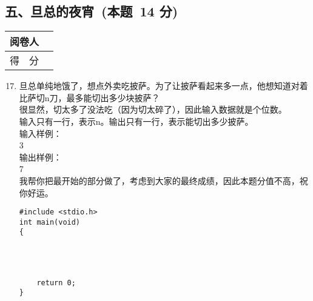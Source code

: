 \documentclass[twocolumn,landscape,UTF8]{ctexart}
\begin{document}
\begin{spacing}{1.3}
\section*{\hspace{4.5cm} 五、旦总的夜宵~(本题~14 分)}
\vspace{-1.5cm}
\begin{tabular}{|p{}|p{}|}
  \hline
    \centering 阅卷人 &         \\
  \hline
    \centering 得~~分 &         \\
  \hline
\end{tabular}
\begin{enumerate}\setcounter{enumi}{16}
    \item 旦总单纯地饿了，想点外卖吃披萨。为了让披萨看起来多一点，他想知道对着比萨切n刀，最多能切出多少块披萨？ \\
    很显然，切太多了没法吃（因为切太碎了），因此输入数据就是个位数。\\
    输入只有一行，表示n。输出只有一行，表示能切出多少披萨。       \\
    输入样例：                                              \\
    3                                                      \\
    输出样例：                                              \\
    7                                                      \\
    我帮你把最开始的部分做了，考虑到大家的最终成绩，因此本题分值不高，祝你好运。
\begin{lstlisting}
#include <stdio.h>
int main(void)
{




    return 0;
}
\end{lstlisting}
\end{enumerate}

\end{spacing}

\clearpage
	
\end{document}
